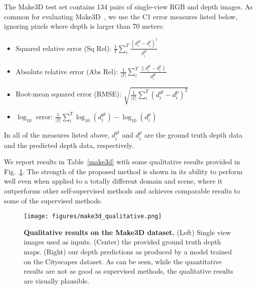 \documentclass[10pt,twocolumn,letterpaper]{article}
\begin{document}
The Make3D test set contains 134 pairs of single-view RGB and depth images. As common for evaluating Make3D~\cite{liu2014discrete}, we use the C1 error measures listed below, ignoring pixels where depth is larger than 70 meters:
\begin{itemize}[nosep]
	\item Squared relative error (Sq Rel): $\frac{1}{T}\sum_{i}^{T} \frac{(d_{i}^{gt} - d_{i}^{p})^2}{d_{i}^{gt}}$
	\item Absolute relative error (Abs Rel): $\frac{1}{|T|}\sum_{i}^T \frac{\|d_{i}^{gt} - d_{i}^{p}\|}{d_{i}^{gt}}$
	\item Root-mean squared error (RMSE): \tiny$\sqrt{\frac{1}{|T|}\sum_{i}^T (d_{i}^{gt} - d_{i}^{p})^2 }$\normalsize
	\item $\log_{10}$ error: $\frac{1}{|T|}\sum_{i}^T \log_{10}(d_{i}^{gt}) - \log_{10}(d_{i}^{p}) $
\end{itemize}
In all of the measures listed above, $d^{gt}_i$ and $d^p_i$ are the ground truth depth data
and the predicted depth data, respectively.

We report results in Table~\ref{make3d} with some qualitative results provided in Fig.~\ref{fig:make3d}.
The strength of the proposed method is shown in its ability to perform well even when applied to a totally different domain and scene, where it outperforms other self-supervised methods and achieves comparable results to some of the supervised methods.

\begin{figure}
	\centering
	\texttt{[image: figures/make3d\_qualitative.png]}
	\caption{{\bf Qualitative results on the Make3D dataset.} (Left) Single view images used as inputs. (Center) the provided ground truth depth maps. (Right) our depth predictions as produced by a model trained on the Cityscapes dataset. As can be seen, while the quantitative results are not as good as supervised methods, the qualitative results are visually plausible.\vspace{-2mm}}
	\label{fig:make3d}
\end{figure}
\end{document}
